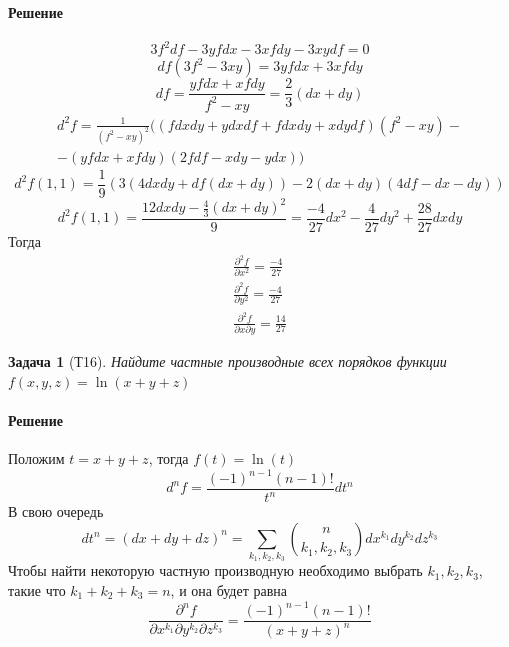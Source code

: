 \documentclass[a4paper,12pt]{report}
\newtheorem{problem}{Задача}[]
\newenvironment{sol}{\paragraph{Решение}}{}
\begin{document}
    \begin{sol}
        \begin{equation*}
            3f^2df-3yfdx-3xfdy-3xydf=0
        \end{equation*}
        \begin{equation*}
            df(3f^2-3xy)=3yfdx+3xfdy
        \end{equation*}
        \begin{equation*}
            df=\frac{yfdx+xfdy}{f^2-xy}=\frac{2}{3}(dx+dy)
        \end{equation*}
        \begin{eqnarray*}
            d^2f=\frac{1}{(f^2-xy)^2}((fdxdy+ydxdf+fdxdy+xdydf)(f^2-xy)-
            \\-(yfdx+xfdy)(2fdf-xdy-ydx))
        \end{eqnarray*}
        \begin{equation*}
            d^2f(1,1)=\frac{1}{9}(3(4dxdy+df(dx+dy))-2(dx+dy)(4df-dx-dy))
        \end{equation*}
        \begin{equation*}
            d^2f(1,1)=\frac{12dxdy-\frac{4}{3}(dx+dy)^2}{9}=\frac{-4}{27}dx^2-\frac{4}{27}dy^2+\frac{28}{27}dxdy
        \end{equation*}
        Тогда
        \begin{eqnarray}
            \frac{\partial^2f}{\partial x^2}=\frac{-4}{27}\\ 
            \frac{\partial^2f}{\partial y^2}=\frac{-4}{27}\\ 
            \frac{\partial^2f}{\partial x\partial y}=\frac{14}{27}
        \end{eqnarray}
    \end{sol}


    \begin{problem}[Т16]
        Найдите частные производные всех порядков функции $f(x,y,z)=\ln{(x+y+z)}$
    \end{problem}
    \begin{sol}
        Положим $t=x+y+z$, тогда $f(t)=\ln(t)$
        \begin{equation}
            d^nf=\frac{(-1)^{n-1}(n-1)!}{t^n}dt^n
        \end{equation}
        В свою очередь 
        \begin{equation}
            dt^n=(dx+dy+dz)^n=\displaystyle\sum_{k_1,k_2,k_3}^{}{n\choose k_1,k_2,k_3}dx^{k_1}dy^{k_2}dz^{k_3}
        \end{equation}
        Чтобы найти некоторую частную производную необходимо выбрать $k_1,k_2,k_3$, такие что $k_1+k_2+k_3=n$, и она будет равна
        \begin{equation}
            \frac{\partial^n f}{\partial x^{k_1}\partial y^{k_2}\partial z^{k_3}}=\frac{(-1)^{n-1}(n-1)!}{(x+y+z)^n}
        \end{equation}
    \end{sol}
    
\end{document}
